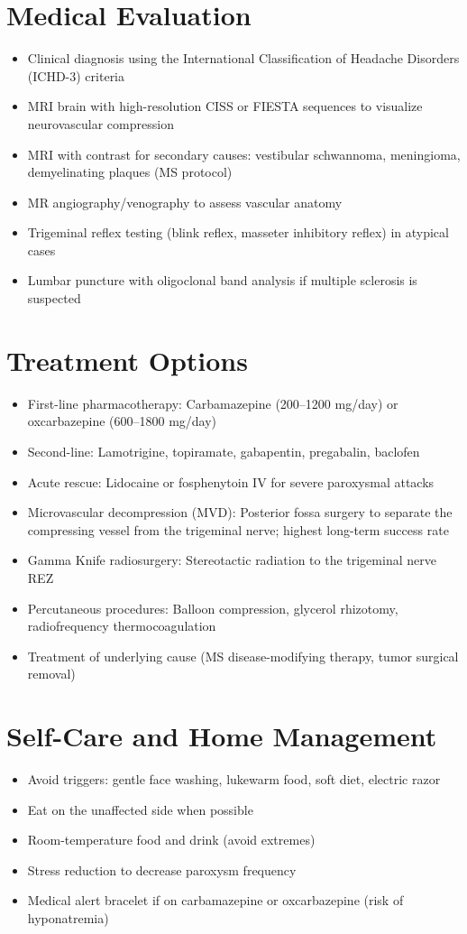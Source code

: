 \section*{Medical Evaluation}
\begin{itemize}
  \item Clinical diagnosis using the International Classification of Headache Disorders (ICHD-3) criteria
  \item MRI brain with high-resolution CISS or FIESTA sequences to visualize neurovascular compression
  \item MRI with contrast for secondary causes: vestibular schwannoma, meningioma, demyelinating plaques (MS protocol)
  \item MR angiography/venography to assess vascular anatomy
  \item Trigeminal reflex testing (blink reflex, masseter inhibitory reflex) in atypical cases
  \item Lumbar puncture with oligoclonal band analysis if multiple sclerosis is suspected
\end{itemize}

\section*{Treatment Options}
\begin{itemize}
  \item First-line pharmacotherapy: Carbamazepine (200--1200 mg/day) or oxcarbazepine (600--1800 mg/day)
  \item Second-line: Lamotrigine, topiramate, gabapentin, pregabalin, baclofen
  \item Acute rescue: Lidocaine or fosphenytoin IV for severe paroxysmal attacks
  \item Microvascular decompression (MVD): Posterior fossa surgery to separate the compressing vessel from the trigeminal nerve; highest long-term success rate
  \item Gamma Knife radiosurgery: Stereotactic radiation to the trigeminal nerve REZ
  \item Percutaneous procedures: Balloon compression, glycerol rhizotomy, radiofrequency thermocoagulation
  \item Treatment of underlying cause (MS disease-modifying therapy, tumor surgical removal)
\end{itemize}

\section*{Self-Care and Home Management}
\begin{itemize}
  \item Avoid triggers: gentle face washing, lukewarm food, soft diet, electric razor
  \item Eat on the unaffected side when possible
  \item Room-temperature food and drink (avoid extremes)
  \item Stress reduction to decrease paroxysm frequency
  \item Medical alert bracelet if on carbamazepine or oxcarbazepine (risk of hyponatremia)
\end{itemize}

